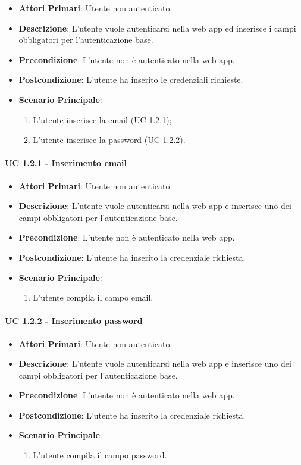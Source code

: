 		\begin{itemize}
			\item \textbf{Attori Primari}: Utente non autenticato.
			\item \textbf{Descrizione}: L'utente vuole autenticarsi nella web app ed inserisce i campi obbligatori per l'autenticazione base.
			\item \textbf{Precondizione}: L'utente non è autenticato nella web app.
			\item \textbf{Postcondizione}: L'utente ha inserito le credenziali richieste.
			\item \textbf{Scenario Principale}:
			\begin{enumerate}
				\item L'utente inserisce la email (UC 1.2.1);
				\item L'utente inserisce la password (UC 1.2.2).
			\end{enumerate}	
		\end{itemize}

			\paragraph{UC 1.2.1 - Inserimento email}
			\begin{itemize}
				\item \textbf{Attori Primari}: Utente non autenticato.
				\item \textbf{Descrizione}: L'utente vuole autenticarsi nella web app e inserisce uno dei campi obbligatori per l'autenticazione base.
				\item \textbf{Precondizione}: L'utente non è autenticato nella web app.
				\item \textbf{Postcondizione}: L'utente ha inserito la credenziale richiesta.
				\item \textbf{Scenario Principale}:
				\begin{enumerate}
					\item L'utente compila il campo email.
				\end{enumerate}	
			\end{itemize}

			\paragraph{UC 1.2.2 - Inserimento password}
			\begin{itemize}
				\item \textbf{Attori Primari}: Utente non autenticato.
				\item \textbf{Descrizione}: L'utente vuole autenticarsi nella web app e inserisce uno dei campi obbligatori per l'autenticazione base.
				\item \textbf{Precondizione}: L'utente non è autenticato nella web app.
				\item \textbf{Postcondizione}: L'utente ha inserito la credenziale richiesta.
				\item \textbf{Scenario Principale}:
				\begin{enumerate}
					\item L'utente compila il campo password.
				\end{enumerate}	
			\end{itemize}

